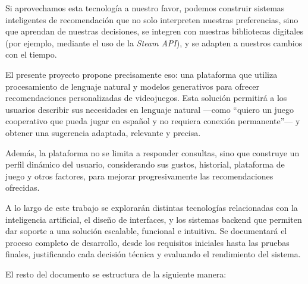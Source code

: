 Si aprovechamos esta tecnología a nuestro favor, podemos construir sistemas inteligentes de recomendación que no solo interpreten nuestras preferencias, sino que aprendan de nuestras decisiones, se integren con nuestras bibliotecas digitales (por ejemplo, mediante el uso de la \textit{Steam API}), y se adapten a nuestros cambios con el tiempo.

El presente proyecto propone precisamente eso: una plataforma que utiliza procesamiento de lenguaje natural y modelos generativos para ofrecer recomendaciones personalizadas de videojuegos. Esta solución permitirá a los usuarios describir sus necesidades en lenguaje natural —como “quiero un juego cooperativo que pueda jugar en español y no requiera conexión permanente”— y obtener una sugerencia adaptada, relevante y precisa.  

Además, la plataforma no se limita a responder consultas, sino que construye un perfil dinámico del usuario, considerando sus gustos, historial, plataforma de juego y otros factores, para mejorar progresivamente las recomendaciones ofrecidas.

A lo largo de este trabajo se explorarán distintas tecnologías relacionadas con la inteligencia artificial, el diseño de interfaces, y los sistemas backend que permiten dar soporte a una solución escalable, funcional e intuitiva. Se documentará el proceso completo de desarrollo, desde los requisitos iniciales hasta las pruebas finales, justificando cada decisión técnica y evaluando el rendimiento del sistema.

\vspace{0.3cm}

El resto del documento se estructura de la siguiente manera:

